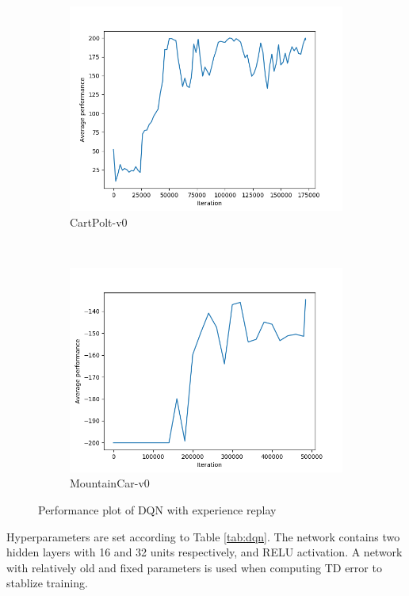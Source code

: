 \documentclass[12pt]{article}
\begin{document}
\begin{figure}[h!]
    \centering
    \begin{subfigure}[t]{0.6\textwidth}
        \includegraphics[width=1\textwidth]{figs/Q3_cp.png}
        \caption{CartPolt-v0}
    \end{subfigure}
    ~
    \begin{subfigure}[t]{0.6\textwidth}
        \includegraphics[width=1\textwidth]{figs/Q3_mc.png}
        \caption{MountainCar-v0}
    \end{subfigure}
    \caption{Performance plot of DQN with experience replay}
    \label{fig:q3}
\end{figure}

Hyperparameters are set according to Table \ref{tab:dqn}. The network contains two hidden layers with 16 and 32 units respectively, and RELU activation. A network with relatively old and fixed parameters is used when computing TD error to stablize training.
\end{document}
